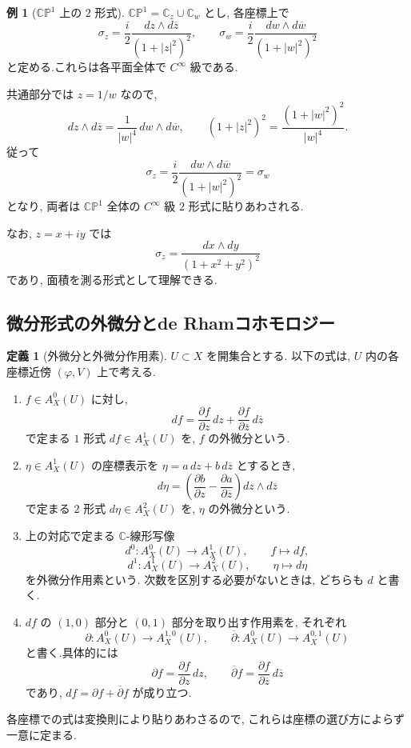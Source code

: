 \documentclass[dvipdfmx,a4paper,11pt]{article} %
\newcommand{\C}{\mathbb{C}}
\theoremstyle{definition}
\numberwithin{equation}{section}
\newtheorem{dfn}[thm]{定義}
\newtheorem{exa}[thm]{例}
\begin{document}
\begin{exa}[$\C\mathbb P^1$ 上の $2$ 形式]
\label{exa-sphere-two-form}
$\C\mathbb P^1=\C_z\cup\C_w$ とし, 各座標上で
\[
\sigma_z=\frac{i}{2}\frac{dz\wedge d\overline z}{(1+|z|^2)^2},
\qquad
\sigma_w=\frac{i}{2}\frac{dw\wedge d\overline w}{(1+|w|^2)^2}
\]
と定める.これらは各平面全体で $C^\infty$ 級である.

共通部分では $z=1/w$ なので, 
\[
dz\wedge d\overline z
=\frac1{|w|^4}\,dw\wedge d\overline w,\qquad
(1+|z|^2)^2=\frac{(1+|w|^2)^2}{|w|^4}.
\]
従って
\[
\sigma_z
=\frac{i}{2}\frac{dw\wedge d\overline w}{(1+|w|^2)^2}
=\sigma_w
\]
となり, 両者は $\C\mathbb P^1$ 全体の $C^\infty$ 級 $2$ 形式に貼りあわされる.

なお, $z=x+iy$ では
\[
\sigma_z=\frac{dx\wedge dy}{(1+x^2+y^2)^2}
\]
であり, 面積を測る形式として理解できる.
\end{exa}



\subsection{微分形式の外微分とde Rhamコホモロジー}\label{O-S021}

\begin{dfn}[外微分と外微分作用素]\label{O-M101}
$U\subset X$ を開集合とする.
以下の式は, $U$ 内の各座標近傍 $(\varphi,V)$ 上で考える.
\begin{enumerate}
\item
$f\in A_X^0(U)$ に対し, 
\[
df=\frac{\partial f}{\partial z}\,dz
  +\frac{\partial f}{\partial\overline z}\,d\overline z
\]
で定まる $1$ 形式 $df\in A_X^1(U)$ を, $f$ の外微分という.

\item
$\eta\in A_X^1(U)$ の座標表示を
$\eta=a\,dz+b\,d\overline z$ とするとき, 
\[
d\eta=
\left(\frac{\partial b}{\partial z}
-\frac{\partial a}{\partial\overline z}\right)
dz\wedge d\overline z
\]
で定まる $2$ 形式 $d\eta\in A_X^2(U)$ を, $\eta$ の外微分という.

\item
上の対応で定まる $\C$-線形写像
\[
d^0:A_X^0(U)\to A_X^1(U),\qquad f\mapsto df,
\]
\[
d^1:A_X^1(U)\to A_X^2(U),\qquad \eta\mapsto d\eta
\]
を外微分作用素という.
次数を区別する必要がないときは, どちらも $d$ と書く.

\item
$df$ の $(1,0)$ 部分と $(0,1)$ 部分を取り出す作用素を, それぞれ
\[
\partial:A_X^0(U)\to A_X^{1,0}(U),\qquad
\overline\partial:A_X^0(U)\to A_X^{0,1}(U)
\]
と書く.具体的には
\[
\partial f=\frac{\partial f}{\partial z}\,dz,\qquad
\overline\partial f=
\frac{\partial f}{\partial\overline z}\,d\overline z
\]
であり, $df=\partial f+\overline\partial f$ が成り立つ.
\end{enumerate}
各座標での式は変換則により貼りあわさるので, 
これらは座標の選び方によらず一意に定まる.
\end{dfn}
\end{document}
